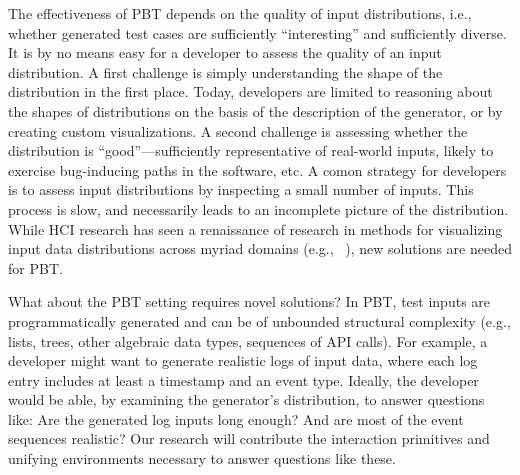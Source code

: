 The effectiveness of PBT depends on the quality of input distributions, i.e., whether generated test cases are sufficiently ``interesting'' and sufficiently diverse.
It is by no means easy for a developer to assess the quality of
an input distribution. A first challenge is simply understanding the shape of the distribution in the first place. Today, developers are limited to reasoning about the shapes of distributions on the basis of the description of the generator, or by creating custom visualizations. A second challenge is assessing whether the distribution is ``good''---sufficiently representative of real-world inputs, likely to exercise bug-inducing paths in the software, etc.
A comon strategy for developers is to assess input distributions by inspecting a
small number of inputs. This process is slow, and necessarily leads to an incomplete picture of the distribution.
While HCI research has seen a renaissance of research in methods for visualizing input data distributions across myriad domains (e.g.,
~\cite{ref:hohman2019gamut,ref:hohman2020understanding,ref:kang2017omnicode}), new solutions are needed for PBT.

What about the PBT setting requires novel solutions?
In PBT, test inputs are
programmatically generated and
can be of unbounded structural
complexity (e.g., lists, trees, other algebraic data types,
sequences of API calls).
For example, a developer might want to generate
realistic logs of input data, where each log entry includes at least a timestamp
and an event type.
%
Ideally, the developer would be able, by examining the generator's
distribution, to answer
questions like: Are the generated log inputs long enough? And are most
of the event sequences realistic?
Our research will contribute the interaction primitives and
 unifying environments necessary to answer questions like these.

